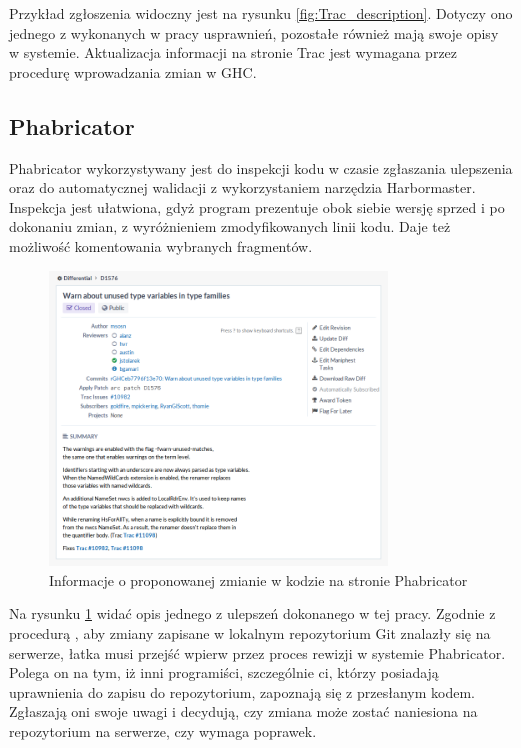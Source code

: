 Przykład zgłoszenia widoczny jest na rysunku \ref{fig:Trac_description}. Dotyczy ono jednego z wykonanych w pracy usprawnień, pozostałe również mają swoje opisy w systemie. Aktualizacja informacji na stronie Trac jest wymagana przez procedurę wprowadzania zmian w GHC\cite{WikiFixingBugs}.

\subsection{Phabricator}

\cite{WikiPhabricator}

Phabricator wykorzystywany jest do inspekcji kodu w czasie zgłaszania ulepszenia oraz do automatycznej walidacji z wykorzystaniem narzędzia Harbormaster. Inspekcja jest ułatwiona, gdyż program prezentuje obok siebie wersję sprzed i po dokonaniu zmian, z wyróżnieniem zmodyfikowanych linii kodu. Daje też możliwość komentowania wybranych fragmentów.

\begin{figure}[ht]
    \centering
    \includegraphics[width=0.8\textwidth]{images/Phabricator_summary}
    \caption{Informacje o proponowanej zmianie w kodzie na stronie Phabricator}
    \label{fig:Phabricator_summary}
\end{figure}

Na rysunku \ref{fig:Phabricator_summary} widać opis jednego z ulepszeń dokonanego w tej pracy. Zgodnie z procedurą \cite{WikiFixingBugs}, aby zmiany zapisane w lokalnym repozytorium Git znalazły się na serwerze, łatka musi przejść wpierw przez proces rewizji w systemie Phabricator. Polega on na tym, iż inni programiści, szczególnie ci, którzy posiadają uprawnienia do zapisu do repozytorium, zapoznają się z przesłanym kodem. Zgłaszają oni swoje uwagi i decydują, czy zmiana może zostać naniesiona na repozytorium na serwerze, czy wymaga poprawek.


